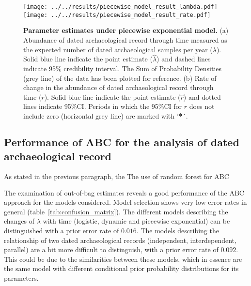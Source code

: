 \documentclass[a4paper]{article}
\begin{document}
\begin{figure}[tbh]
\center\texttt{[image: ../../results/piecewise\_model\_result\_lambda.pdf]}
\center\texttt{[image: ../../results/piecewise\_model\_result\_rate.pdf]}
\caption{\textbf{Parameter estimates under piecewise exponential model.} (a) Abundance of dated archaeological record through time measured as the expected number of dated archaeological samples per year ($\lambda$). Solid blue line indicate the point estimate ($\hat\lambda$) and dashed lines indicate 95\% credibility interval. The Sum of Probability Densities (grey line) of the data has been plotted for reference. (b) Rate of change in the abundance of dated archaeological record through time ($r$). Solid blue line indicate the point estimate ($\hat{r}$) and dotted lines indicate 95\%CI. Periods in which the 95\%CI for $r$ does not include zero (horizontal grey line) are marked with '\textbf{*}´.}
\label{fig:piecewise_results}
\end{figure}









\subsection*{Performance of ABC for the analysis of dated archaeological record}

As stated in the previous paragraph, the The use of random forest for ABC

The examination of out-of-bag estimates reveals a good performance of the ABC approach for the models considered. Model selection shows very low error rates in general (table~\ref{tab:confusion_matrix}). The different models describing the changes of $\lambda$ with time (logistic, dynamic and piecewise exponential) can be distinguished with a prior error rate of $0.016$. The models describing the relationship of two dated archaeological records (independent, interdependent, parallel) are a bit more difficult to distinguish, with a prior error rate of $0.092$. This could be due to the similarities between these models, which in essence are the same model with different conditional prior probability distributions for its parameters.
\\
\end{document}
